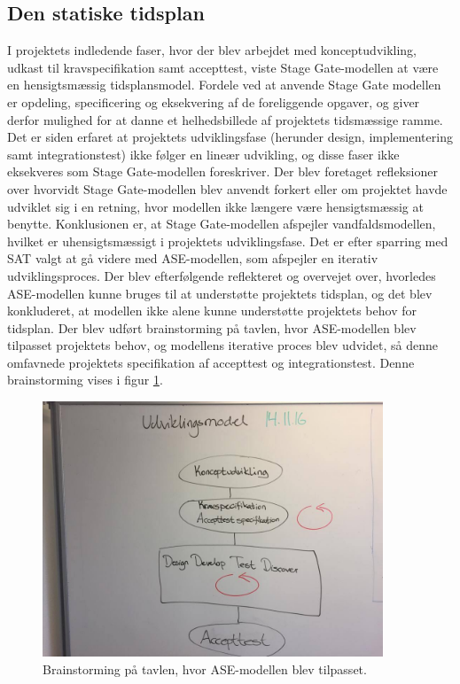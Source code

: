 \subsection{Den statiske tidsplan}

	I projektets indledende faser, hvor der blev arbejdet med konceptudvikling, udkast til kravspecifikation samt accepttest, viste Stage Gate-modellen at være en hensigtsmæssig tidsplansmodel. Fordele ved at anvende Stage Gate modellen er opdeling, specificering og eksekvering af de foreliggende opgaver, og giver derfor mulighed for at danne et helhedsbillede af projektets tidsmæssige ramme. Det er siden erfaret at projektets udviklingsfase (herunder design, implementering samt integrationstest) ikke følger en lineær udvikling, og disse faser ikke eksekveres som Stage Gate-modellen foreskriver. Der blev foretaget refleksioner over hvorvidt Stage Gate-modellen blev anvendt forkert eller om projektet havde udviklet sig i en retning, hvor modellen ikke længere være hensigtsmæssig at benytte. Konklusionen er, at Stage Gate-modellen afspejler vandfaldsmodellen, hvilket er uhensigtsmæssigt i projektets udviklingsfase. Det er efter sparring med SAT valgt at gå videre med ASE-modellen, som afspejler en iterativ udviklingsproces. Der blev efterfølgende reflekteret og overvejet over, hvorledes ASE-modellen kunne bruges til at understøtte projektets tidsplan, og det blev konkluderet, at modellen ikke alene kunne understøtte projektets behov for tidsplan. Der blev udført brainstorming på tavlen, hvor ASE-modellen blev tilpasset projektets behov, og modellens iterative proces blev udvidet, så denne omfavnede projektets specifikation af accepttest og integrationstest. Denne brainstorming vises i figur \ref{fig:ASEbrain}.  
	
	\begin{figure}[htb]
		\centering
		\includegraphics[width=4in]{ASEbrain.jpg}
		\caption{Brainstorming på tavlen, hvor ASE-modellen blev tilpasset.}
		\label{fig:ASEbrain}	
	\end{figure}
	
